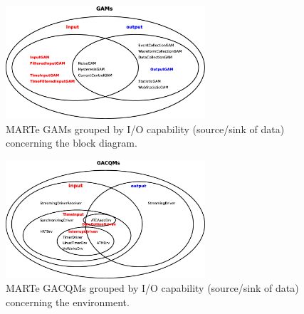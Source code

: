\begin{figure}[h!]
 \begin{center}
  \includegraphics[width=0.66\textwidth]{MARTe/GAMs-io.eps}
  \caption{MARTe GAMs grouped by I/O capability (source/sink of data) concerning the block diagram.}
  \label{f:MARTe:GAM:io}
 \end{center}
\end{figure}

\begin{figure}[h!]
 \begin{center}
  \includegraphics[width=0.66\textwidth]{MARTe/GACQMs-io.eps}
  \caption{MARTe GACQMs grouped by I/O capability (source/sink of data) concerning the environment.}
  \label{f:MARTe:GACQM:io}
 \end{center}
\end{figure}


